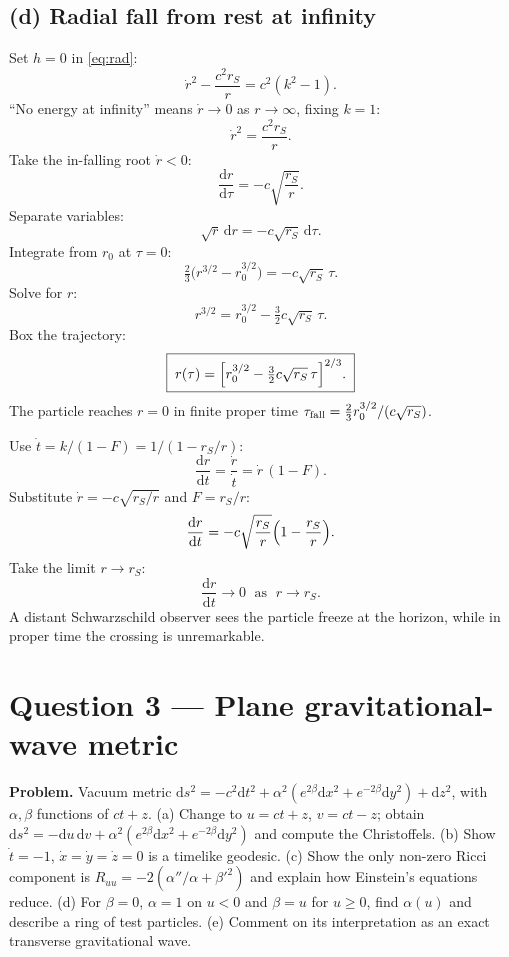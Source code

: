 \documentclass[11pt]{article}
\newcommand{\de}{\mathrm{d}}
\begin{document}
\subsection*{(d) Radial fall from rest at infinity}

Set $h=0$ in \eqref{eq:rad}:
\[
\dot r^{2}-\frac{c^{2}r_{S}}{r}=c^{2}(k^{2}-1).
\]
``No energy at infinity'' means $\dot r\to 0$ as $r\to\infty$, fixing $k=1$:
\[
\dot r^{2}=\frac{c^{2}r_{S}}{r}.
\]
Take the in-falling root $\dot r<0$:
\[
\frac{\de r}{\de\tau}=-c\sqrt{\frac{r_{S}}{r}}.
\]
Separate variables:
\[
\sqrt{r}\,\de r=-c\sqrt{r_{S}}\,\de\tau.
\]
Integrate from $r_{0}$ at $\tau=0$:
\[
\tfrac{2}{3}\bigl(r^{3/2}-r_{0}^{3/2}\bigr)=-c\sqrt{r_{S}}\,\tau.
\]
Solve for $r$:
\[
r^{3/2}=r_{0}^{3/2}-\tfrac{3}{2}c\sqrt{r_{S}}\,\tau.
\]
Box the trajectory:
\begin{equation}
\boxed{\;r(\tau)=\Bigl[r_{0}^{3/2}-\tfrac{3}{2}c\sqrt{r_{S}}\,\tau\Bigr]^{2/3}.\;}
\label{eq:radialfall}
\end{equation}
The particle reaches $r=0$ in finite proper time $\tau_{\rm fall}=\tfrac{2}{3}r_{0}^{3/2}/(c\sqrt{r_{S}})$.

Use $\dot t=k/(1-F)=1/(1-r_{S}/r)$:
\[
\frac{\de r}{\de t}=\frac{\dot r}{\dot t}=\dot r\,(1-F).
\]
Substitute $\dot r=-c\sqrt{r_{S}/r}$ and $F=r_{S}/r$:
\[
\frac{\de r}{\de t}=-c\sqrt{\frac{r_{S}}{r}}\Bigl(1-\frac{r_{S}}{r}\Bigr).
\]
Take the limit $r\to r_{S}$:
\[
\boxed{\;\frac{\de r}{\de t}\to 0\;\text{ as }\;r\to r_{S}.\;}
\]
A distant Schwarzschild observer sees the particle freeze at the horizon, while in proper time the crossing is unremarkable.

\section*{Question 3 --- Plane gravitational-wave metric}

\textbf{Problem.}  Vacuum metric $\de s^{2}=-c^{2}\de t^{2}+\alpha^{2}(e^{2\beta}\de x^{2}+e^{-2\beta}\de y^{2})+\de z^{2}$, with $\alpha,\beta$ functions of $ct+z$.  (a) Change to $u=ct+z$, $v=ct-z$; obtain $\de s^{2}=-\de u\,\de v+\alpha^{2}(e^{2\beta}\de x^{2}+e^{-2\beta}\de y^{2})$ and compute the Christoffels.  (b) Show $\dot t=-1$, $\dot x=\dot y=\dot z=0$ is a timelike geodesic.  (c) Show the only non-zero Ricci component is $R_{uu}=-2(\alpha''/\alpha+\beta'^{2})$ and explain how Einstein's equations reduce.  (d) For $\beta=0$, $\alpha=1$ on $u<0$ and $\beta=u$ for $u\ge 0$, find $\alpha(u)$ and describe a ring of test particles.  (e) Comment on its interpretation as an exact transverse gravitational wave.
\end{document}
